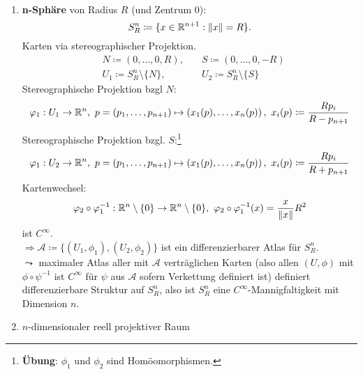 \begin{example}
  \
  \begin{enumerate}
    \item \textbf{n-Sphäre} von Radius \( R \) (und Zentrum \( 0 \)):
      \begin{equation*}
        S_R^n \coloneqq \{ x \in \mathbb{R}^{n+1} : \Vert x \Vert = R \}\text{.}
      \end{equation*}
      Karten via stereographischer Projektion.
      \begin{align*}
        &N \coloneqq (0, \dots, 0, R), \quad &S \coloneqq (0, \dots, 0, -R) \\
        &U_1 \coloneqq S_R^n \setminus \{ N \}, \quad &U_2 \coloneqq S_R^n \setminus \{ S \}
      \end{align*}
      Stereographische Projektion bzgl \( N \):
      \begin{equation*}
        \varphi_1 : U_1 \to \mathbb{R}^n, \ p = (p_1, \dots, p_{n+1}) \mapsto \left( x_1(p), \dots, x_n(p) \right), \ x_i(p) \coloneqq \frac{Rp_i}{R-p_{n+1}}
      \end{equation*}
      Stereographische Projektion bzgl. \( S \):\footnote{\textbf{Übung}: \( \phi_1 \) und \( \phi_2 \) sind Homöomorphismen.}
      \begin{equation*}
        \varphi_1 : U_2 \to \mathbb{R}^n, \ p = (p_1, \dots, p_{n+1}) \mapsto \left( x_1(p), \dots, x_n(p) \right), \ x_i(p) \coloneqq \frac{Rp_i}{R+p_{n+1}}
      \end{equation*}
      Kartenwechsel:
      \begin{equation*}
        \varphi_2 \circ \varphi_1^{-1} : \mathbb{R}^n \setminus \{ 0 \} \to \mathbb{R}^n \setminus \{ 0 \}, \ \varphi_2 \circ \varphi_1^{-1}(x) = \frac{x}{\Vert x \Vert}R^2
      \end{equation*}
      ist \( C^\infty \). \\
      \( \Rightarrow \mathcal{A} \coloneqq \{ (U_1, \phi_1), (U_2, \phi_2) \} \) ist ein differenzierbarer Atlas für \( S_R^n \). \\
      \( \leadsto \) maximaler Atlas aller mit \( \mathcal{A} \) verträglichen Karten (also allen \( (U, \phi) \) mit \( \phi \circ \psi^{-1} \) ist \( C^\infty \) für \( \psi \) aus \( \mathcal{A} \) sofern Verkettung definiert ist) definiert differenzierbare Struktur auf \( S_R^n \), also ist \( S_R^n \) eine \( C^\infty \)-Mannigfaltigkeit mit Dimension \( n \).
    \item \( n \)-dimensionaler reell projektiver Raum
      \begin{equation*}

\end{equation*}
\end{enumerate}
\end{example}
